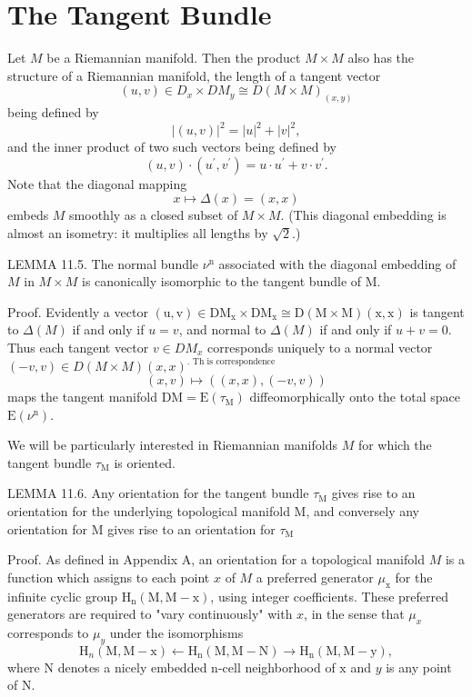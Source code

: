\documentclass[10pt]{article}
\begin{document}
\section{The Tangent Bundle}
Let $M$ be a Riemannian manifold. Then the product $M \times M$ also has the structure of a Riemannian manifold, the length of a tangent vector
$$
(u, v) \in D_{x} \times D M_{y} \cong D(M \times M)_{(x, y)}
$$
being defined by
$$
|(u, v)|^{2}=|u|^{2}+|v|^{2},
$$
and the inner product of two such vectors being defined by
$$
(u, v) \cdot\left(u^{\prime}, v^{\prime}\right)=u \cdot u^{\prime}+v \cdot v^{\prime} .
$$
Note that the diagonal mapping
$$
x \mapsto \Delta(x)=(x, x)
$$
embeds $M$ smoothly as a closed subset of $M \times M$. (This diagonal embedding is almost an isometry: it multiplies all lengths by $\sqrt{2}$.)

LEMMA 11.5. The normal bundle $\nu^{\mathrm{n}}$ associated with the diagonal embedding of $M$ in $M \times M$ is canonically isomorphic to the tangent bundle of M.

Proof. Evidently a vector $(\mathrm{u}, \mathrm{v}) \in \mathrm{DM}_{\mathrm{x}} \times \mathrm{DM}_{\mathrm{x}} \cong \mathrm{D}(\mathrm{M} \times \mathrm{M})(\mathrm{x}, \mathrm{x})$ is tangent to $\Delta(M)$ if and only if $u=v$, and normal to $\Delta(M)$ if and only if $u+v=0$. Thus each tangent vector $v \in D M_{x}$ corresponds uniquely to a normal vector $(-v, v) \in D(M \times M)(x, x)^{\text {. Th is correspondence }}$
$$
(x, v) \mapsto((x, x),(-v, v))
$$
maps the tangent manifold $\mathrm{DM}=\mathrm{E}\left(\tau_{\mathrm{M}}\right)$ diffeomorphically onto the total space $\mathrm{E}\left(\nu^{\mathrm{n}}\right)$.

We will be particularly interested in Riemannian manifolds $M$ for which the tangent bundle $\tau_{\mathrm{M}}$ is oriented.

LEMMA 11.6. Any orientation for the tangent bundle $\tau_{\mathrm{M}}$ gives rise to an orientation for the underlying topological manifold $\mathrm{M}$, and conversely any orientation for $\mathrm{M}$ gives rise to an orientation for $\tau_{\mathrm{M}}$

Proof. As defined in Appendix A, an orientation for a topological manifold $M$ is a function which assigns to each point $x$ of $M$ a preferred generator $\mu_{\mathrm{x}}$ for the infinite cyclic group $\mathrm{H}_{\mathrm{n}}(\mathrm{M}, \mathrm{M}-\mathrm{x})$, using integer coefficients. These preferred generators are required to "vary continuously" with $x$, in the sense that $\mu_{x}$ corresponds to $\mu_{y}$ under the isomorphisms
$$
\mathrm{H}_{n}(\mathrm{M}, \mathrm{M}-\mathrm{x}) \leftarrow \mathrm{H}_{\mathrm{n}}(\mathrm{M}, \mathrm{M}-\mathrm{N}) \rightarrow \mathrm{H}_{\mathrm{n}}(\mathrm{M}, \mathrm{M}-\mathrm{y}),
$$
where $\mathrm{N}$ denotes a nicely embedded $\mathrm{n}$-cell neighborhood of $\mathrm{x}$ and $y$ is any point of $\mathrm{N}$.
\end{document}
